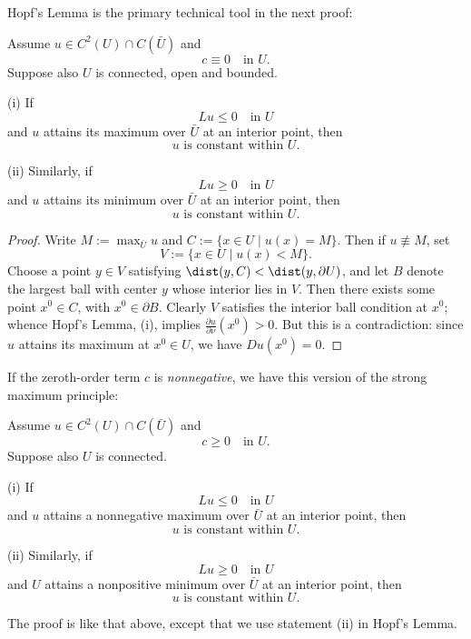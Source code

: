 Hopf's Lemma is the primary technical tool in the next proof:

\begin{theorem}
\label{thm:strong-maximum-principle-c-zero}
Assume $u \in C^2(U) \cap C(\bar U)$ and
$$c \equiv 0 \quad \text{in } U.$$
Suppose also $U$ is connected, open and bounded.

(i) If
$$Lu \leq 0 \quad \text{in } U$$
and $u$ attains its maximum over $\bar U$ at an interior point, then
$$u \text{ is constant within } U.$$

(ii) Similarly, if
$$Lu \geq 0 \quad \text{in } U$$
and $u$ attains its minimum over $\bar U$ at an interior point, then
$$u \text{ is constant within } U.$$
\end{theorem}

\begin{proof}
Write $M := \max_{\bar U} u$ and $C := \{x \in U \mid u(x) = M\}$. Then if $u \not\equiv M$, set
$$V := \{x \in U \mid u(x) < M\}.$$
Choose a point $y \in V$ satisfying $\dist(y,C) < \dist(y,\partial U)$, and let $B$ denote the largest ball with center $y$ whose interior lies in $V$. Then there exists some point $x^0 \in C$, with $x^0 \in \partial B$. Clearly $V$ satisfies the interior ball condition at $x^0$; whence Hopf's Lemma, (i), implies $\frac{\partial u}{\partial\nu}(x^0) > 0$. But this is a contradiction: since $u$ attains its maximum at $x^0 \in U$, we have $Du(x^0) = 0$.
\end{proof}

If the zeroth-order term $c$ is \textit{nonnegative}, we have this version of the strong maximum principle:

\begin{theorem}
\label{thm:strong-maximum-principle-c-nonneg}
Assume $u \in C^2(U) \cap C(\bar U)$ and
$$c \geq 0 \quad \text{in } U.$$
Suppose also $U$ is connected.

(i) If
$$Lu \leq 0 \quad \text{in } U$$
and $u$ attains a nonnegative maximum over $\bar U$ at an interior point, then
$$u \text{ is constant within } U.$$

(ii) Similarly, if
$$Lu \geq 0 \quad \text{in } U$$
and $U$ attains a nonpositive minimum over $\bar U$ at an interior point, then
$$u \text{ is constant within } U.$$

The proof is like that above, except that we use statement (ii) in Hopf's Lemma.
\end{theorem}

